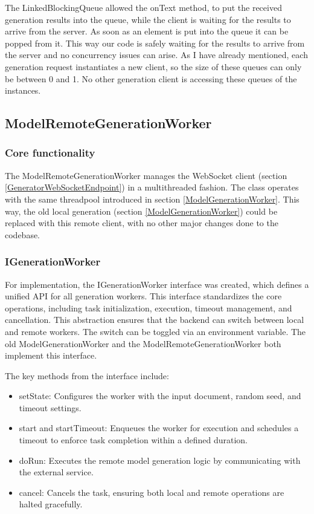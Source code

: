 				The LinkedBlockingQueue allowed the onText method, to put the received generation
				results into the queue, while the client is waiting for the results to arrive from the server. As soon as an element is put into the queue
				it can be popped from it. This way our code is safely waiting for the results
				to arrive from the server and no concurrency issues can arise. As I have already mentioned, each generation request instantiates a new
				client, so the size of these queues can only be between 0 and 1. No other generation client is accessing these queues of the instances.


		\subsection{ModelRemoteGenerationWorker} \label{ModelRemoteGenerationWorker}
			\subsubsection{Core functionality}
				The ModelRemoteGenerationWorker manages the WebSocket client (section \ref{GeneratorWebSocketEndpoint}) in a multithreaded
				fashion. The class operates with the same threadpool introduced in section \ref{ModelGenerationWorker}. This way, the old 
				local generation (section \ref{ModelGenerationWorker}) could be replaced with this remote client, 
				with no other major changes done to the codebase.

			\subsubsection{IGenerationWorker}
				For implementation, the IGenerationWorker interface was created, which defines a unified API for all generation workers. 
				This interface standardizes the core operations, including task initialization, execution, timeout management, and cancellation.
				This abstraction ensures that the backend can switch between local and remote workers. The switch can be toggled via
				an environment variable. The old ModelGenerationWorker and the ModelRemoteGenerationWorker both implement this interface.

				The key methods from the interface include:
				\begin{itemize}
					\item setState: Configures the worker with the input document, random seed, and timeout settings.
					\item start and startTimeout: Enqueues the worker for execution and schedules a timeout to enforce task completion within a defined duration.
					\item doRun: Executes the remote model generation logic by communicating with the external service.
					\item \label{workercancel}cancel: Cancels the task, ensuring both local and remote operations are halted gracefully.
				\end{itemize}

